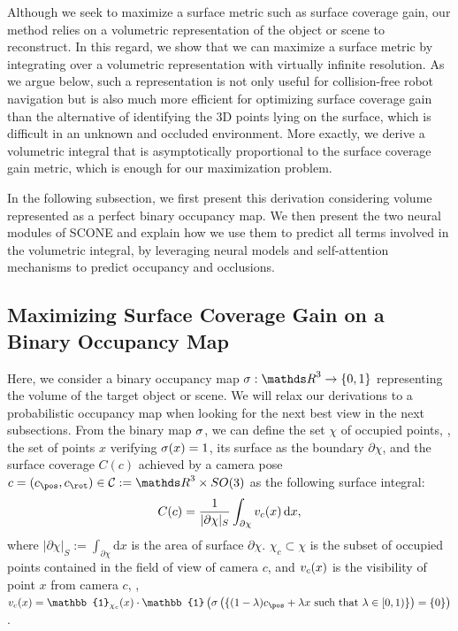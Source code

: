 {Although we seek to maximize a surface metric such as surface coverage gain, our method relies on a volumetric representation of the object or scene to reconstruct. In this regard, we show that we can maximize a surface metric by integrating over a volumetric representation with virtually infinite resolution. As we argue below, such a representation is not only useful for collision-free robot navigation but is also much more efficient for optimizing surface coverage gain than the alternative of identifying the 3D points lying on the surface, which is difficult in an unknown and occluded environment. More exactly, we derive a volumetric integral that is asymptotically proportional to the surface coverage gain metric, which is enough for our maximization problem. 

In the following subsection, we first present this derivation considering volume represented as a perfect binary occupancy map. We then present the two neural modules of SCONE and explain how we use them to predict all terms involved in the volumetric integral, by leveraging neural models and self-attention mechanisms to predict occupancy and occlusions.}

\subsection{Maximizing Surface Coverage Gain on a Binary Occupancy Map}

Here, we consider a binary occupancy map $\occfield:\IR^3 \rightarrow \{0,1\}$ representing the volume of the target object or scene. We will relax our derivations to a probabilistic occupancy map when looking for the next best view in the next subsections. From the binary map $\sigma$, we can define the set $\chi$ of occupied points, \ie, the set of points $x$ verifying $\sigma(x) = 1$, its surface as the boundary $\partial\chi$, and the surface coverage $C(c)$ achieved by a camera pose $c=(c_\pos, c_\rot)\in\calC:=\IR^3\times SO(3)$ as the following surface integral:
%
\begin{equation}
    \label{eqn:surface_coverage_definition}
    C(c) = \frac{1}{|\partial\chi|_S} \int_{\partial\chi} v_c(x)\,\text{d}x,
\end{equation}
%
where $|\partial \chi|_S := \int_{\partial\chi}\text{d}x$ is the area of surface $\partial\chi$. $\chi_c \subset \chi$ is the subset of occupied points contained in the field of view of camera $c$, and $v_c(x)$ is the visibility of point $x$ from camera $c$, \ie, $\absvis_c(x) = \mathbb{1}_{\chi_c}(x) \cdot \mathbb{1}\left(\occfield\left(\{(1-\lambda) c_\pos + \lambda x \text{ such that } \lambda\in[0,1)\}\right)=\{0\}\right)$. 

